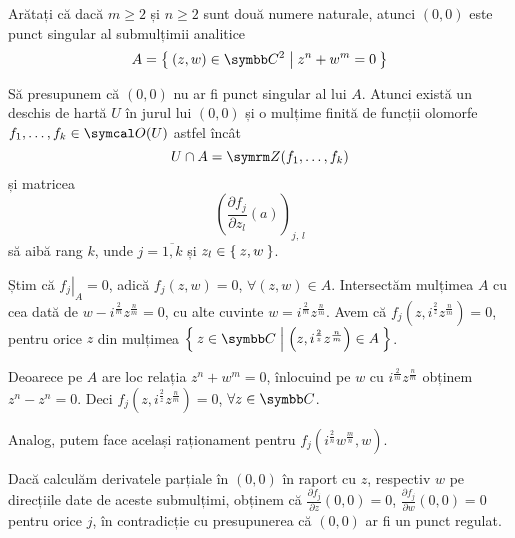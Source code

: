 \begin{problem}
Arătați că dacă \(m \geq 2\) și \(n \geq 2\) sunt două numere naturale, atunci \((0, 0)\) este punct singular al submulțimii analitice
\[
    A = \Set{ (z, w) \in \complex^2 | z^n + w^m = 0 }
\]
\end{problem}
\begin{solution}
Să presupunem că \((0, 0)\) nu ar fi punct singular al lui \(A\). Atunci există un deschis de hartă \(U\) în jurul lui \((0, 0)\) și o mulțime finită de funcții olomorfe \(f_1, \dots, f_k \in \sheaf(U)\) astfel încât
\[
    U \cap A = \zeros(f_1, \dots, f_k)
\]
și matricea
\[
    \left(\frac{\partial f_j}{\partial z_l} (a)\right)_{j, \, l}
\]
să aibă rang \(k\), unde \(j = \overline{1, k}\) și \(z_l \in \Set{z, w}\).

Știm că \(\left.f_j\right|_A = 0\), adică \(f_j (z, w) = 0\), \(\forall (z, w) \in A\). Intersectăm mulțimea \(A\) cu cea dată de \(w -  i^{\frac{2}{m}} z^{\frac{n}{m}} = 0\), cu alte cuvinte \(w = i^{\frac{2}{m}} z^{\frac{n}{m}}\). Avem că \(f_j \left(z, i^{\frac{2}{z}} z^{\frac{n}{m}}\right) = 0\), pentru orice \(z\) din mulțimea \(\Set{ z \in \complex | \left(z, i^{\frac{2}{z}} z^{\frac{n}{m}}\right) \in A }\).

Deoarece pe \(A\) are loc relația \(z^n + w^m = 0\), înlocuind pe \(w\) cu \(i^{\frac{2}{m}} z^{\frac{n}{m}}\) obținem \(z^n - z^n = 0\). Deci \(f_j \left(z, i^{\frac{2}{z}} z^{\frac{n}{m}}\right) = 0\), \(\forall z \in \complex\).

Analog, putem face același raționament pentru \(f_j\left(i^{\frac{2}{n}} w^{\frac{m}{n}}, w\right)\).

Dacă calculăm derivatele parțiale în \((0, 0)\) în raport cu \(z\), respectiv \(w\) pe direcțiile date de aceste submulțimi, obținem că \(\frac{\partial f_j}{\partial z} (0, 0) = 0\), \(\frac{\partial f_j}{\partial w} (0, 0) = 0\) pentru orice \(j\), în contradicție cu presupunerea că \((0, 0)\) ar fi un punct regulat.
\end{solution}
